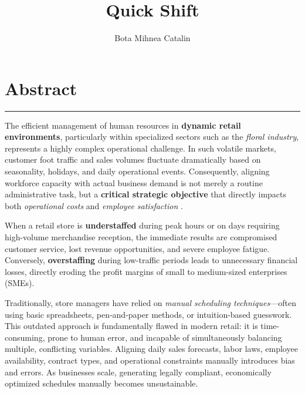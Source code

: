 \documentclass[12pt]{report}
\begin{document}
\title{Quick Shift}					   
\author{Bota Mihnea Catalin}											
				
\maketitle



\cleardoublepage
\section*{Abstract}
\vspace{0.5cm}	
\hrule
\vspace{0.5cm}

The efficient management of human resources in \textbf{dynamic retail environments}, particularly within specialized sectors such as the \emph{floral industry}, represents a highly complex operational challenge. In such volatile markets, customer foot traffic and sales volumes fluctuate dramatically based on seasonality, holidays, and daily operational events. Consequently, aligning workforce capacity with actual business demand is not merely a routine administrative task, but a \textbf{critical strategic objective} that directly impacts both \emph{operational costs} and \emph{employee satisfaction} \cite{RetailIncomeScheduling}. 

When a retail store is \textbf{understaffed} during peak hours or on days requiring high-volume merchandise reception, the immediate results are compromised customer service, lost revenue opportunities, and severe employee fatigue. Conversely, \textbf{overstaffing} during low-traffic periods leads to unnecessary financial losses, directly eroding the profit margins of small to medium-sized enterprises (SMEs).

Traditionally, store managers have relied on \emph{manual scheduling techniques}—often using basic spreadsheets, pen-and-paper methods, or intuition-based guesswork. This outdated approach is fundamentally flawed in modern retail: it is time-consuming, prone to human error, and incapable of simultaneously balancing multiple, conflicting variables. Aligning daily sales forecasts, labor laws, employee availability, contract types, and operational constraints manually introduces bias and errors. As businesses scale, generating legally compliant, economically optimized schedules manually becomes unsustainable.
\end{document}
